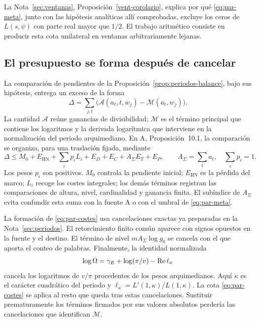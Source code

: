 La Nota~\ref{sec:ventanas}, Proposición~\ref{vent-corolario}, explica por
qué \eqref{eq:par-meta}, junto con las hipótesis analíticas allí
comprobadas, excluye los ceros de $L(s,\psi)$ con parte real mayor
que $1/2$. El trabajo aritmético consiste en producir esta cota
unilateral en ventanas arbitrariamente lejanas.

\subsection{El presupuesto se forma después de cancelar}

La comparación de pendientes de la Proposición~\ref{prop:periodos-balance},
bajo sus hipótesis, entrega un exceso de la forma
\[
 \Delta=\sum_{j,t}
   \bigl(\mathcal A(a_t,t,w_j)-\mathcal M(a_t,w_j)\bigr).
\]
La cantidad $\mathcal A$ reúne ganancias de divisibilidad; $\mathcal M$
es el término principal que contiene los logaritmos y la derivada
logarítmica que interviene en la normalización del periodo
arquimediano. En A, Proposición~10.1, la comparación se organiza,
para una traslación fijada, mediante
\begin{equation}
 \Delta\le M_0+E_{\mathrm{HN}}+
       \sum_i p_iL_i+E_D+E_C+A_\Sigma E_T+E_P,
 \qquad A_\Sigma=\sum_t a_t,\quad \sum_i p_i=1.
 \label{eq:par-costes}
\end{equation}
Los pesos $p_i$ son positivos. $M_0$ controla la pendiente inicial;
$E_{\mathrm{HN}}$ es la pérdida del marco; $L_i$ recoge los costes
integrales; los demás términos registran las comparaciones de altura,
nivel, cardinalidad y ganancia finita. El subíndice de $A_\Sigma$ evita
confundir esta suma con la fuente A o con el umbral de
\eqref{eq:par-meta}.

La formación de \eqref{eq:par-costes} usa cancelaciones exactas ya
preparadas en la Nota~\ref{sec:periodos}. El retorcimiento finito común
aparece con signos opuestos en la fuente y el destino. El término de
nivel $mA_\Sigma\log g_0$ se cancela con el que aporta el conteo de
palabras. Finalmente, la identidad normalizada
\begin{equation}
 \log\Omega=\gamma_E+\log(\pi/v)-\operatorname{Re}\ell_\kappa
 \label{eq:par-periodo}
\end{equation}
cancela los logaritmos de $v/\pi$ procedentes de los pesos
arquimedianos. Aquí $\kappa$ es el carácter cuadrático del periodo y
$\ell_\kappa=L'(1,\kappa)/L(1,\kappa)$.
La cota \eqref{eq:par-costes} se aplica al resto que queda tras estas
cancelaciones. Sustituir prematuramente los términos firmados por sus
valores absolutos perdería las cancelaciones que identifican
$\mathcal M$.

